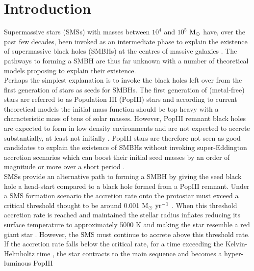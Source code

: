 \documentclass[twocolumn,iop,revtex4]{openjournal}
\newcommand{\msolar} {$\rm{M_{\odot}}~$}
\newcommand{\msolaryr} {$\rm{M_{\odot}~yr^{-1}}~$}
\begin{document}
\section{Introduction} \label{Sec:Introduction}
Supermassive stars (SMSs) with masses between $10^4$ and $10^5$ \msolar have, over the past few decades, been invoked \citep{Rees_1978, Begelman_1978, Begelman_2006,
  Begelman_2008, Latif_2016a, Woods_2018} as an intermediate phase to explain the existence of supermassive black holes (SMBHs) at the centres of massive galaxies \citep{Fan_06, Kormendy_2013}.
The pathways to forming a SMBH are thus far unknown with a number of theoretical models proposing to explain their existence. \\
\indent Perhaps the
simplest explanation is to invoke the black holes left over from the first 
generation of stars as seeds for SMBHs. The first generation of (metal-free) 
stars are referred to as Population III (PopIII) stars and according to 
current theoretical models \citep[e.g.][]{Turk_2009, Clark_2008, Hirano_2014, Stacy_2016} the initial mass function should be
top heavy with a characteristic mass of tens of solar masses. However, PopIII remnant black holes are expected to form in low
density environments \citep{Whalen_2004, OShea_2005b, Milosavljevic_2009} and are not expected to accrete substantially, at least not 
initially \citep{Alvarez_2009, Smith_2018}. PopIII stars are therefore not seen as good candidates to explain the existence
of SMBHs without invoking super-Eddington accretion scenarios which can boost their initial 
seed masses by an order of magnitude or more over a short period
\citep{Lupi_2014, Pacucci_2015a, Sakurai_2016a,Inayoshi_2016, Pacucci_2017, Inayoshi_2018}.\\
\indent SMSs provide an alternative path to forming a SMBH by giving the seed black hole a
head-start compared to a black hole formed from a PopIII remnant. Under a SMS formation scenario
the accretion rate onto the protostar must exceed a critical threshold thought to be around
0.001 \msolaryr \citep{Haemmerle_2017}. When
this threshold accretion rate is reached and maintained the stellar radius inflates reducing
its surface temperature to approximately 5000 K
and making the star resemble a red giant star
\citep{Omukai_2003, Hosokawa_2012, Hosokawa_2013, Woods_2017}. However, the SMS must continue to
accrete above this threshold rate. If the accretion rate falls below the critical
rate, for a time exceeding the Kelvin-Helmholtz time \citep{Sakurai_2016}, the star contracts to the main sequence and becomes a hyper-luminous PopIII
\end{document}
